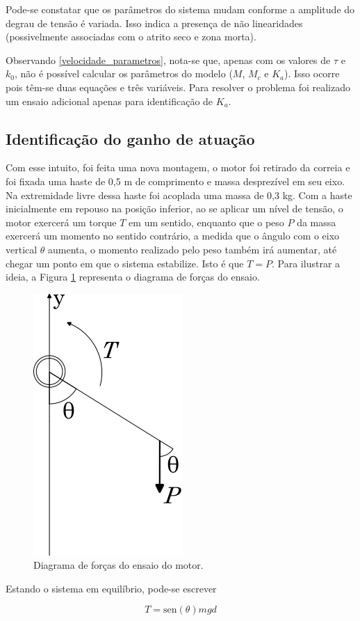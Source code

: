 Pode-se constatar que os parâmetros do sistema mudam conforme a amplitude do degrau de tensão é variada. Isso indica a presença de não linearidades (possivelmente associadas com o atrito seco e zona morta).

Observando \eqref{velocidade_parametros}, nota-se que, apenas com os valores de $\tau$ e $k_0$, não é possível calcular os parâmetros do modelo ($M$, $M_c$ e $K_a$). Isso ocorre pois têm-se duas equações e três variáveis. Para resolver o problema foi realizado um ensaio adicional apenas para identificação de $K_a$.

\subsection{Identificação do ganho de atuação}
Com esse intuito, foi feita uma nova montagem, o motor foi retirado da correia e foi fixada uma haste de 0,5 m de comprimento e massa desprezível em seu eixo. Na extremidade livre dessa haste foi acoplada uma massa de 0,3 kg. Com a haste inicialmente em repouso na posição inferior, ao se aplicar um nível de tensão, o motor exercerá um torque $T$ em um sentido, enquanto que o peso $P$ da massa exercerá um momento no sentido contrário, a medida que o ângulo com o eixo vertical $\theta$ aumenta, o momento realizado pelo peso também irá aumentar, até chegar um ponto em que o sistema estabilize. Isto é que $T = P$. Para ilustrar a ideia, a Figura \ref{fig:diagrama_torque} representa o diagrama de forças do ensaio.

\begin{figure}[H]
    \centering
    \includegraphics[width=0.2\linewidth]{figuras/diagrama_torque.png}
    \caption[Diagrama de forças do ensaio do motor]{Diagrama de forças do ensaio do motor.}
    \label{fig:diagrama_torque}
\end{figure}

Estando o sistema em equilíbrio, pode-se escrever

\begin{equation}
    T = \text{sen}(\theta)mgd
    \label{torque_motor}
\end{equation}


